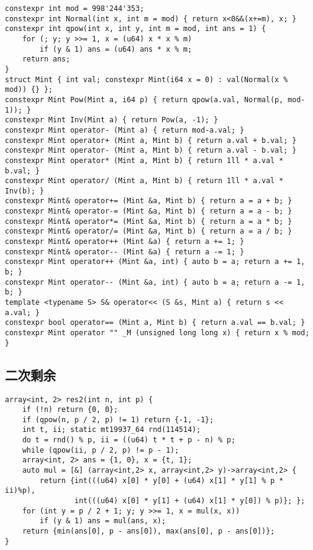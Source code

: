 \documentclass[a4paper,landscape,twocolumn]{ctexart}
\begin{document}
\begin{lstlisting}[basicstyle=\footnotesize\ttfamily]
constexpr int mod = 998'244'353;
constexpr int Normal(int x, int m = mod) { return x<0&&(x+=m), x; }
constexpr int qpow(int x, int y, int m = mod, int ans = 1) {
	for (; y; y >>= 1, x = (u64) x * x % m)
		if (y & 1) ans = (u64) ans * x % m;
	return ans;
}
struct Mint { int val; constexpr Mint(i64 x = 0) : val(Normal(x % mod)) {} };
constexpr Mint Pow(Mint a, i64 p) { return qpow(a.val, Normal(p, mod-1)); }
constexpr Mint Inv(Mint a) { return Pow(a, -1); }
constexpr Mint operator- (Mint a) { return mod-a.val; }
constexpr Mint operator+ (Mint a, Mint b) { return a.val + b.val; }
constexpr Mint operator- (Mint a, Mint b) { return a.val - b.val; }
constexpr Mint operator* (Mint a, Mint b) { return 1ll * a.val * b.val; }
constexpr Mint operator/ (Mint a, Mint b) { return 1ll * a.val * Inv(b); }
constexpr Mint& operator+= (Mint &a, Mint b) { return a = a + b; }
constexpr Mint& operator-= (Mint &a, Mint b) { return a = a - b; }
constexpr Mint& operator*= (Mint &a, Mint b) { return a = a * b; }
constexpr Mint& operator/= (Mint &a, Mint b) { return a = a / b; }
constexpr Mint& operator++ (Mint &a) { return a += 1; }
constexpr Mint& operator-- (Mint &a) { return a -= 1; }
constexpr Mint operator++ (Mint &a, int) { auto b = a; return a += 1, b; }
constexpr Mint operator-- (Mint &a, int) { auto b = a; return a -= 1, b; }
template <typename S> S& operator<< (S &s, Mint a) { return s << a.val; }
constexpr bool operator== (Mint a, Mint b) { return a.val == b.val; }
constexpr Mint operator "" _M (unsigned long long x) { return x % mod; }
\end{lstlisting}

\subsection{二次剩余}

\begin{lstlisting}[]
array<int, 2> res2(int n, int p) {
	if (!n) return {0, 0};
	if (qpow(n, p / 2, p) != 1) return {-1, -1};
	int t, ii; static mt19937_64 rnd(114514);
	do t = rnd() % p, ii = ((u64) t * t + p - n) % p;
	while (qpow(ii, p / 2, p) != p - 1);
	array<int, 2> ans = {1, 0}, x = {t, 1};
	auto mul = [&] (array<int,2> x, array<int,2> y)->array<int,2> {
		return {int(((u64) x[0] * y[0] + (u64) x[1] * y[1] % p * ii)%p),
				int(((u64) x[0] * y[1] + (u64) x[1] * y[0]) % p)}; };
	for (int y = p / 2 + 1; y; y >>= 1, x = mul(x, x))
		if (y & 1) ans = mul(ans, x);
	return {min(ans[0], p - ans[0]), max(ans[0], p - ans[0])};
}
\end{lstlisting}
\end{document}
